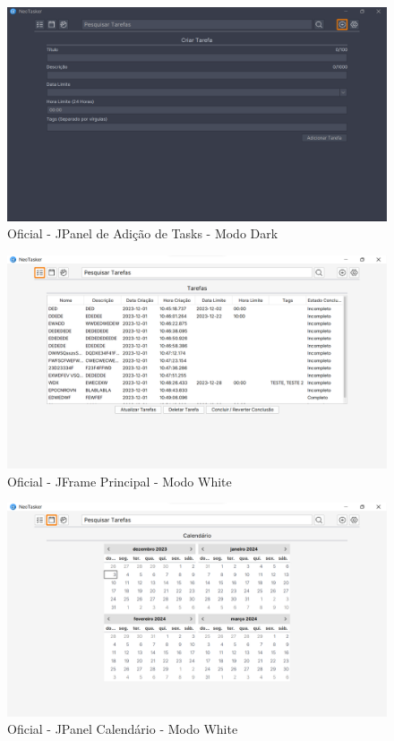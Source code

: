 \documentclass[a4paper,12pt]{article}
\begin{document}
\begin{figure}[H]
	\centering
	\includegraphics[scale=0.19]{prototypes/oficial_dark/create.png}
	\caption{Oficial - JPanel de Adição de Tasks - Modo Dark}
\end{figure}

\begin{figure}[H]
	\centering
	\includegraphics[scale=0.19]{prototypes/oficial_white/list.png}
	\caption{Oficial - JFrame Principal - Modo White}
\end{figure}

\pagebreak
\begin{figure}[H]
	\centering
	\includegraphics[scale=0.19]{prototypes/oficial_white/calendar.png}
	\caption{Oficial - JPanel Calendário - Modo White}
\end{figure}
\end{document}
